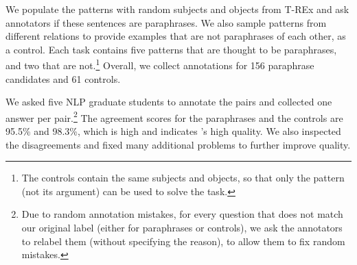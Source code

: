 
We populate the patterns with random subjects and objects from T-REx \cite{trex} and ask annotators if these sentences are paraphrases.
We also sample patterns from different relations to provide
examples that are not paraphrases of each other, as a control.
Each task contains five patterns that are thought
to be paraphrases, and two that are not.\footnote{The
  controls contain the same subjects and objects, so
  that only the pattern (not its argument) can be used to
  solve the task.}
Overall, we collect annotations for 156 paraphrase candidates and 61 controls.

We asked five NLP graduate students to  annotate the pairs and collected one answer per pair.\footnote{Due to random annotation mistakes, for every question
that does not match our original label (either for
paraphrases or controls), we ask the annotators to relabel
them (without specifying the reason), to allow them to fix
random mistakes.}
The agreement scores for the paraphrases and the controls
are 95.5\% and 98.3\%, which is high and
indicates \resource's high quality.
We also inspected  the disagreements  %
and fixed many additional problems %
to further improve  quality.
% 



